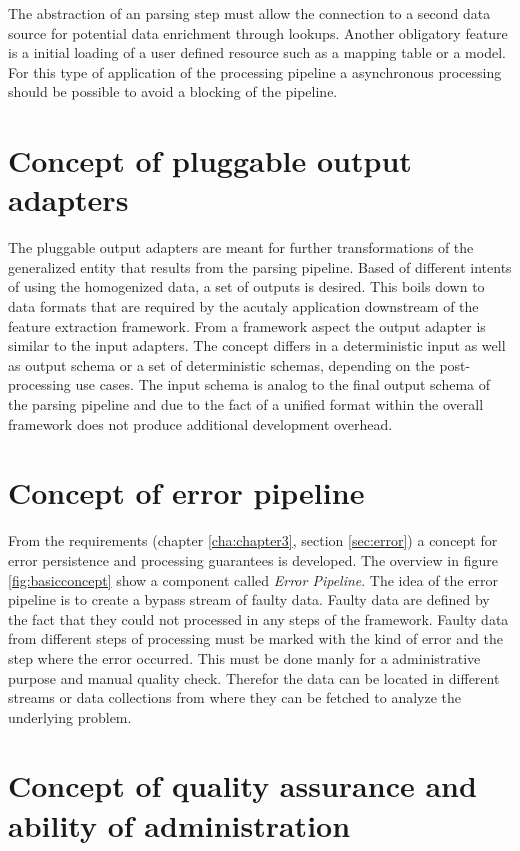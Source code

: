 The abstraction of an parsing step must allow the connection to a second data source for potential data enrichment through lookups. Another obligatory feature is a initial loading of a user defined resource such as a mapping table or a model. For this type of application of the processing pipeline a asynchronous processing should be possible to avoid a blocking of the pipeline.

\section{Concept of pluggable output adapters\label{sec:componentsoutput}}

The pluggable output adapters are meant for further transformations of the generalized entity that results from the parsing pipeline. Based of different intents of using the homogenized data, a set of outputs is desired. This boils down to data formats that are required by the acutaly application downstream of the feature extraction framework. From a framework aspect the output adapter is similar to the input adapters. The concept differs in a deterministic input as well as output schema or a set of deterministic schemas, depending on the post-processing use cases. The input schema is analog to the final output schema of the parsing pipeline and due to the fact of a unified format within the overall framework does not produce additional development overhead. 

\section{Concept of error pipeline \label{sec:errorpipeline}}

From the requirements (chapter \ref{cha:chapter3}, section \ref{sec:error}) a concept for error persistence and processing guarantees is developed. The overview in figure \ref{fig:basicconcept} show a component called \textit{Error Pipeline}. The idea of the error pipeline is to create a bypass stream of faulty data. Faulty data are defined by the fact that they could not processed in any steps of the framework. Faulty data from different steps of processing must be marked with the kind of error and the step where the error occurred. This must be done manly for a administrative purpose and manual quality check. Therefor the data can be located in different streams or data collections from where they can be fetched to analyze the underlying problem.

\section{Concept of quality assurance and ability of administration}

